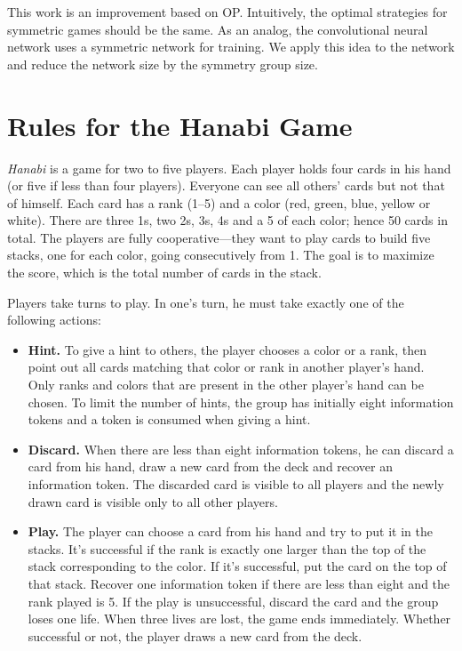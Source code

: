 \documentclass[12pt]{article}
\begin{document}
\begin{spacing}{1.15}
This work is an improvement based on OP. Intuitively, the optimal strategies for symmetric games should be the same. As an analog, the convolutional neural network uses a symmetric network for training. We apply this idea to the network and reduce the network size by the symmetry group size.

\section{Rules for the Hanabi Game}

\textsl{Hanabi} is a game for two to five players. Each player holds four cards in his hand (or five if less than four players). Everyone can see all others' cards but not that of himself. Each card has a rank (1--5) and a color (red, green, blue, yellow or white). There are three 1s, two 2s, 3s, 4s and a 5 of each color; hence 50 cards in total. The players are fully cooperative---they want to play cards to build five stacks, one for each color, going consecutively from 1. The goal is to maximize the score, which is the total number of cards in the stack.

Players take turns to play. In one's turn, he must take exactly one of the following actions:

\begin{itemize}
\item \textbf{Hint.} To give a hint to others, the player chooses a color or a rank, then point out all cards matching that color or rank in another player's hand. Only ranks and colors that are present in the other player's hand can be chosen. To limit the number of hints, the group has initially eight information tokens and a token is consumed when giving a hint.
\item \textbf{Discard.} When there are less than eight information tokens, he can discard a card from his hand, draw a new card from the deck and recover an information token. The discarded card is visible to all players and the newly drawn card is visible only to all other players.
\item \textbf{Play.} The player can choose a card from his hand and try to put it in the stacks. It's successful if the rank is exactly one larger than the top of the stack corresponding to the color. If it's successful, put the card on the top of that stack. Recover one information token if there are less than eight and the rank played is 5. If the play is unsuccessful, discard the card and the group loses one life. When three lives are lost, the game ends immediately. Whether successful or not, the player draws a new card from the deck.
\end{itemize}


\end{spacing}
\end{document}
